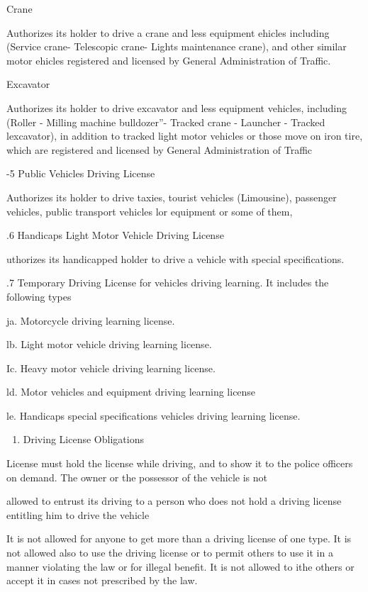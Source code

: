 \documentclass{book}
\begin{document}
Crane

Authorizes its holder to drive a crane and less equipment ehicles
including (Service crane- Telescopic crane- Lights maintenance crane),
and other similar motor ehicles registered and licensed by General
Administration of Traffic.

Excavator

Authorizes its holder to drive excavator and less equipment vehicles,
including (Roller - Milling machine bulldozer''- Tracked crane -
Launcher - Tracked lexcavator), in addition to tracked light motor
vehicles or those move on iron tire, which are registered and licensed
by General Administration of Traffic

-5 Public Vehicles Driving License

Authorizes its holder to drive taxies, tourist vehicles (Limousine),
passenger vehicles, public transport vehicles lor equipment or some of
them,

.6 Handicaps Light Motor Vehicle Driving License

uthorizes its handicapped holder to drive a vehicle with special
specifications.

.7 Temporary Driving License for vehicles driving learning. It includes
the following types

ja. Motorcycle driving learning license.

lb. Light motor vehicle driving learning license.

Ic. Heavy motor vehicle driving learning license.

ld. Motor vehicles and equipment driving learning license

le. Handicaps special specifications vehicles driving learning license.

\begin{enumerate}
	\def\labelenumi{\arabic{enumi}.}
	\setcounter{enumi}{1}
	\tightlist
	\item
	      Driving License Obligations
\end{enumerate}

License must hold the license while driving, and to show it to the
police officers on demand. The owner or the possessor of the vehicle is
not

allowed to entrust its driving to a person who does not hold a driving
license entitling him to drive the vehicle

It is not allowed for anyone to get more than a driving license of one
type. It is not allowed also to use the driving license or to permit
others to use it in a manner violating the law or for illegal benefit.
It is not allowed to ithe others or accept it in cases not prescribed by
the law.
\end{document}
